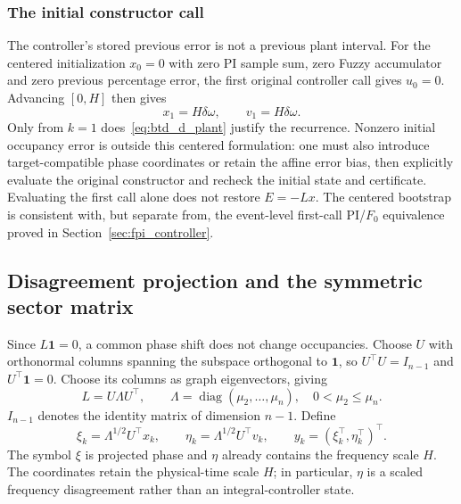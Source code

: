 \subsubsection{The initial constructor call}
The controller's stored previous error is not a previous plant interval.
For the centered initialization $x_0=0$ with zero PI sample sum, zero
Fuzzy accumulator and zero previous percentage error, the first original
controller call gives $u_0=0$. Advancing $[0,H]$ then gives
\begin{equation}
 x_1=H\delta\omega,\qquad v_1=H\delta\omega.
 \label{eq:btd_bootstrap}
\end{equation}
Only from $k=1$ does~\eqref{eq:btd_d_plant} justify the recurrence.
Nonzero initial occupancy error is outside this centered formulation:
one must also introduce target-compatible phase coordinates or retain the
affine error bias, then explicitly evaluate the original constructor and
recheck the initial state and certificate. Evaluating the first call alone
does not restore $E=-Lx$. The centered bootstrap is consistent with, but separate from, the
event-level first-call PI/$F_0$ equivalence proved in Section~\ref{sec:fpi_controller}.

\subsection{Disagreement projection and the symmetric sector matrix}

Since $L\mathbf1=0$, a common phase shift does not change occupancies.
Choose $U$ with orthonormal columns spanning the subspace orthogonal to
$\mathbf1$, so $U^\top U=I_{n-1}$ and $U^\top\mathbf1=0$. Choose its
columns as graph eigenvectors, giving
\begin{equation}
 L=U\Lambda U^\top,\qquad
 \Lambda=\operatorname{diag}(\mu_2,\ldots,\mu_n),\quad 0<\mu_2\le\mu_n.
 \label{eq:btd_d_spectrum}
\end{equation}
$I_{n-1}$ denotes the identity matrix of dimension $n-1$. Define
\begin{equation}
 \xi_k=\Lambda^{1/2}U^\top x_k,\qquad
 \eta_k=\Lambda^{1/2}U^\top v_k,\qquad y_k=(\xi_k^\top,\eta_k^\top)^\top.
 \label{eq:btd_projection}
\end{equation}
The symbol $\xi$ is projected phase and $\eta$ already contains the
frequency scale $H$. The coordinates retain the physical-time scale $H$; in particular,
$\eta$ is a scaled frequency disagreement rather than an integral-controller state.

